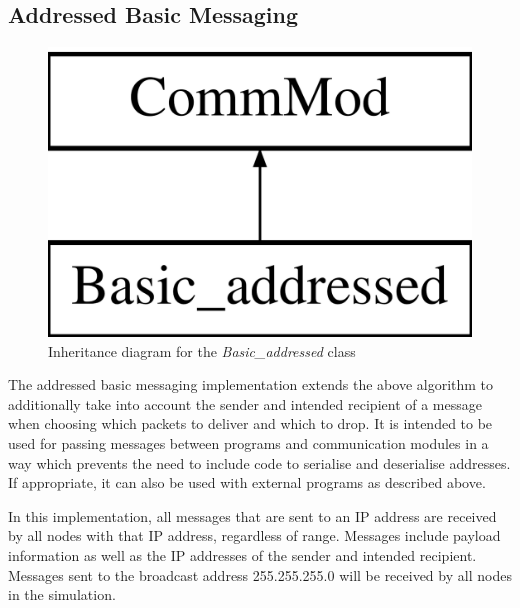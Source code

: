\subsection{Addressed Basic Messaging}
\begin{figure}[H]
\centering
\includegraphics[scale=0.2]{../documentation/latex/class_basic__addressed}
\caption{Inheritance diagram for the \textit{Basic\_addressed} class}
\end{figure}

The addressed basic messaging implementation extends the above algorithm to additionally take into account the sender and intended recipient of a message when choosing which packets to deliver and which to drop. It is intended to be used for passing messages between programs and communication modules in a way which prevents the need to include code to serialise and deserialise addresses. If appropriate, it can also be used with external programs as described above.

In this implementation, all messages that are sent to an IP address are received by all nodes with that IP address, regardless of range. Messages include payload information as well as the IP addresses of the sender and intended recipient. Messages sent to the broadcast address 255.255.255.0 will be received by all nodes in the simulation.	
	

